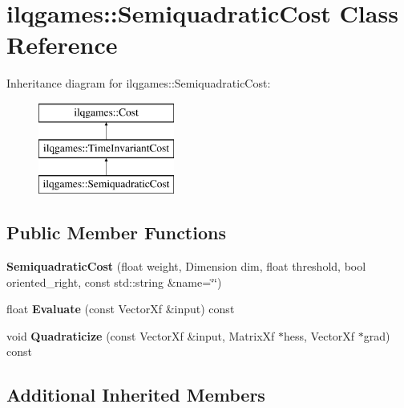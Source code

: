 \hypertarget{classilqgames_1_1_semiquadratic_cost}{}\section{ilqgames\+:\+:Semiquadratic\+Cost Class Reference}
\label{classilqgames_1_1_semiquadratic_cost}
Inheritance diagram for ilqgames\+:\+:Semiquadratic\+Cost\+:\begin{figure}[H]
\begin{center}
\leavevmode
\includegraphics[height=3.000000cm]{classilqgames_1_1_semiquadratic_cost}
\end{center}
\end{figure}
\subsection*{Public Member Functions}
\begin{DoxyCompactItemize}
\item 
{\bfseries Semiquadratic\+Cost} (float weight, Dimension dim, float threshold, bool oriented\+\_\+right, const std\+::string \&name=\char`\"{}\char`\"{})\hypertarget{classilqgames_1_1_semiquadratic_cost_a007448675efe7997d373403c08eaaff1}{}\label{classilqgames_1_1_semiquadratic_cost_a007448675efe7997d373403c08eaaff1}

\item 
float {\bfseries Evaluate} (const Vector\+Xf \&input) const \hypertarget{classilqgames_1_1_semiquadratic_cost_a1c4e3c92a5f72383d72c4d8e3191c26c}{}\label{classilqgames_1_1_semiquadratic_cost_a1c4e3c92a5f72383d72c4d8e3191c26c}

\item 
void {\bfseries Quadraticize} (const Vector\+Xf \&input, Matrix\+Xf $\ast$hess, Vector\+Xf $\ast$grad) const \hypertarget{classilqgames_1_1_semiquadratic_cost_a70151cab48cd670278704948c144cda6}{}\label{classilqgames_1_1_semiquadratic_cost_a70151cab48cd670278704948c144cda6}

\end{DoxyCompactItemize}
\subsection*{Additional Inherited Members}


